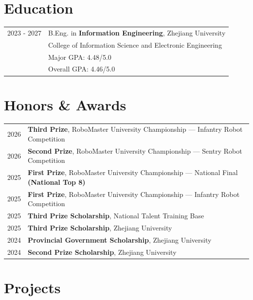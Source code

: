 \documentclass[a4paper,12pt]{article}
\begin{document}
\section{Education}
\begin{tabularx}{\linewidth}{@{}l X@{}}
2023 - 2027 & B.Eng. in \textbf{Information Engineering}, Zhejiang University \hfill \normalsize \\
& College of Information Science and Electronic Engineering \\
& Major GPA: 4.48/5.0 \\
& Overall GPA: 4.46/5.0 \\
\end{tabularx}

\section{Honors \& Awards}
\begin{tabularx}{\linewidth}{@{}l X@{}}
2026 & \textbf{Third Prize}, RoboMaster University Championship --- Infantry Robot Competition \\[3.75pt]
2026 & \textbf{Second Prize}, RoboMaster University Championship --- Sentry Robot Competition \\[3.75pt]
2025 & \textbf{First Prize}, RoboMaster University Championship --- National Final \textbf{(National Top 8)} \\[3.75pt]
2025 & \textbf{First Prize}, RoboMaster University Championship --- Infantry Robot Competition \\[3.75pt]
2025 & \textbf{Third Prize Scholarship}, National Talent Training Base \\[3.75pt]
2025 & \textbf{Third Prize Scholarship}, Zhejiang University \\[3.75pt]
2024 & \textbf{Provincial Government Scholarship}, Zhejiang University \\[3.75pt]
2024 & \textbf{Second Prize Scholarship}, Zhejiang University \\
\end{tabularx}

\section{Projects}
\end{document}
